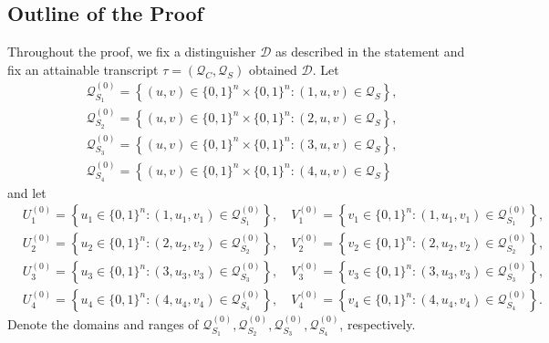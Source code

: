 \subsection{Outline of the Proof}
\label{sec:proof-sketch-4-rounds}

Throughout the proof, we fix a distinguisher $\mathcal{D}$ as described in the statement and fix an attainable transcript $\tau =\left(\mathcal{Q}_{C}, \mathcal{Q}_{S}\right)$ obtained $\mathcal{D}$. Let
%
$$
\begin{aligned}
&\mathcal{Q}_{S_{1}}^{(0)}=\left\{(u, v) \in\{0,1\}^{n} \times\{0,1\}^{n}:(1, u, v) \in \mathcal{Q}_{S} \right\},\\
&\mathcal{Q}_{S_{2}}^{(0)}=\left\{(u, v) \in\{0,1\}^{n} \times\{0,1\}^{n}:(2, u, v) \in \mathcal{Q}_{S} \right\},\\
&\mathcal{Q}_{S_{3}}^{(0)}=\left\{(u, v) \in\{0,1\}^{n} \times\{0,1\}^{n}:(3, u, v) \in \mathcal{Q}_{S} \right\},\\
&\mathcal{Q}_{S_{4}}^{(0)}=\left\{(u, v) \in\{0,1\}^{n} \times\{0,1\}^{n}:(4, u, v) \in \mathcal{Q}_{S} \right\}
\end{aligned}
$$
%
and let       {\small
%
\begin{align*}
&U_{1}^{(0)}=\left\{u_{1} \in\{0,1\}^{n}:\left(1, u_{1}, v_{1}\right) \in \mathcal{Q}_{S_{1}}^{(0)}\right\}, \quad V_{1}^{(0)}=\left\{v_{1} \in\{0,1\}^{n}:\left(1, u_{1}, v_{1}\right) \in \mathcal{Q}_{S_{1}}^{(0)}\right\},\\
&U_{2}^{(0)}=\left\{u_{2} \in\{0,1\}^{n}:\left(2, u_{2}, v_{2}\right) \in \mathcal{Q}_{S_{2}}^{(0)}\right\}, \quad V_{2}^{(0)}=\left\{v_{2} \in\{0,1\}^{n}:\left(2, u_{2}, v_{2}\right) \in \mathcal{Q}_{S_{2}}^{(0)}\right\},\\
&U_{3}^{(0)}=\left\{u_{3} \in\{0,1\}^{n}:\left(3, u_{3}, v_{3}\right) \in \mathcal{Q}_{S_{3}}^{(0)}\right\}, \quad V_{3}^{(0)}=\left\{v_{3} \in\{0,1\}^{n}:\left(3, u_{3}, v_{3}\right) \in \mathcal{Q}_{S_{3}}^{(0)}\right\},\\
&U_{4}^{(0)}=\left\{u_{4} \in\{0,1\}^{n}:\left(4, u_{4}, v_{4}\right) \in \mathcal{Q}_{S_{4}}^{(0)}\right\}, \quad V_{4}^{(0)}=\left\{v_{4} \in\{0,1\}^{n}:\left(4, u_{4}, v_{4}\right) \in \mathcal{Q}_{S_{4}}^{(0)}\right\}.
\end{align*}
}%
%
Denote the domains and ranges of $\mathcal{Q}_{S_{1}}^{(0)}, \mathcal{Q}_{S_{2}}^{(0)}, \mathcal{Q}_{S_{3}}^{(0)}, \mathcal{Q}_{S_{4}}^{(0)}$, respectively.



